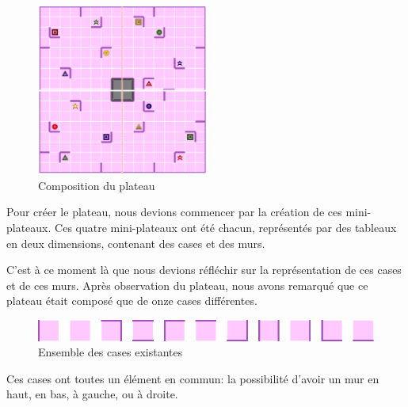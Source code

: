 \documentclass[a4paper, 12pt]{article}
\begin{document}
            \begin{figure}[H]
            	\centering\includegraphics[width=0.5\textwidth]{images/plateauDecoupe.png}
            	\caption{Composition du plateau}
            \end{figure}
            
            Pour créer le plateau, nous devions commencer par la création de ces mini-plateaux. Ces quatre mini-plateaux ont été chacun, représentés par des tableaux en deux dimensions, contenant des cases et des murs. 
            
            C'est à ce moment là que nous devions réfléchir sur la représentation de ces cases et de ces murs. Après observation du plateau, nous avons remarqué que ce plateau était composé que de onze cases différentes.
            
            \begin{figure}[H]
            	\centering\includegraphics[scale=0.60]{images/liste_cases.png}
            	\caption{Ensemble des cases existantes}
            \end{figure}
            
            Ces cases ont toutes un élément en commun: la possibilité d'avoir un mur en haut, en bas, à gauche, ou à droite.
    
            \vspace{0.5cm}
            \begin{center}
            \end{center}  
            \vspace{0.5cm}
            
\end{document}

